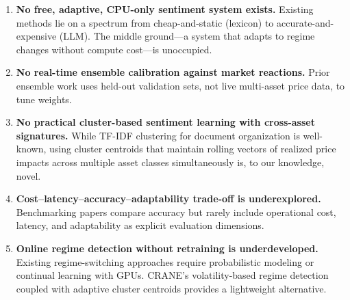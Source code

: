 \begin{enumerate}[label=\textbf{G\arabic*}.]
    \item \textbf{No free, adaptive, CPU-only sentiment system exists.} Existing methods lie on a spectrum from cheap-and-static (lexicon) to accurate-and-expensive (LLM). The middle ground---a system that adapts to regime changes without compute cost---is unoccupied.
    \item \textbf{No real-time ensemble calibration against market reactions.} Prior ensemble work uses held-out validation sets, not live multi-asset price data, to tune weights.
    \item \textbf{No practical cluster-based sentiment learning with cross-asset signatures.} While TF-IDF clustering for document organization is well-known, using cluster centroids that maintain rolling vectors of realized price impacts across multiple asset classes simultaneously is, to our knowledge, novel.
    \item \textbf{Cost--latency--accuracy--adaptability trade-off is underexplored.} Benchmarking papers compare accuracy but rarely include operational cost, latency, and adaptability as explicit evaluation dimensions.
    \item \textbf{Online regime detection without retraining is underdeveloped.} Existing regime-switching approaches require probabilistic modeling or continual learning with GPUs. CRANE's volatility-based regime detection coupled with adaptive cluster centroids provides a lightweight alternative.
\end{enumerate}
